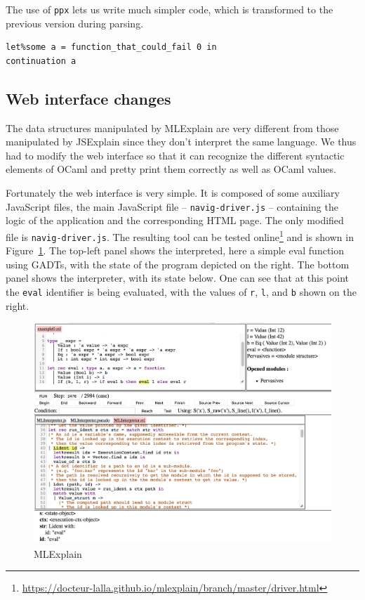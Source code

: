 \documentclass[twocolumn,a4paper]{article}
\begin{document}
The use of \texttt{ppx} lets us write much simpler code, which is transformed to
the previous version during parsing.
\begin{verbatim}
let%some a = function_that_could_fail 0 in
continuation a
\end{verbatim}

\subsection{Web interface changes}

The data structures manipulated by MLExplain are very different from those
manipulated by JSExplain since they don't interpret the same language. We thus
had to modify the web interface so that it can recognize the different syntactic
elements of OCaml and pretty print them correctly as well as OCaml values.

Fortunately the web interface is very simple. It is composed of some auxiliary
JavaScript files, the main JavaScript file -- \texttt{navig-driver.js} --
containing the logic of the application and the corresponding HTML page. The
only modified file is \texttt{navig-driver.js}. The resulting tool can be tested
online\footnote{\url{https://docteur-lalla.github.io/mlexplain/branch/master/driver.html}}
and is shown in Figure~\ref{fig:mlexplain}. The top-left panel shows the
interpreted, here a simple eval function using GADTs, with the state of the
program depicted on the right. The bottom panel shows the
interpreter, with its state below. One can see that at this point the
\texttt{eval} identifier is being evaluated, with the values of \texttt{r},
\texttt{l}, and \texttt{b} shown on the right.

\begin{figure}
  \centering
  \includegraphics[width=14cm]{mlexplain.png}
  \caption{MLExplain}
  \label{fig:mlexplain}
\end{figure}
\end{document}
